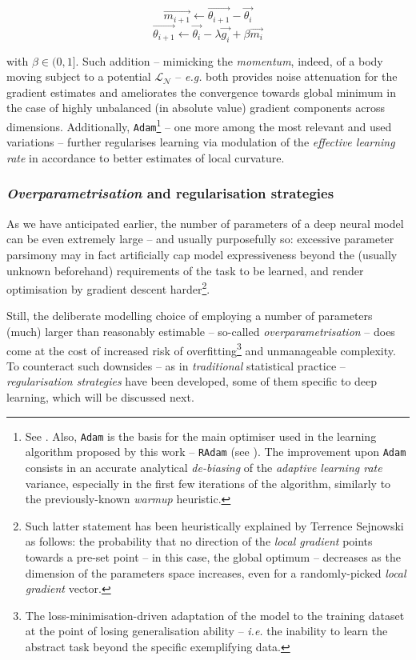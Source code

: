 $$\vec{m_{i+1}} \leftarrow  \vec{\theta_{i+1}} - \vec{\theta_{i}}$$
$$\vec{\theta_{i+1}} \leftarrow  \vec{\theta_{i}} - \lambda\vec{g_i} + \beta\vec{m_i}$$

with $\beta \in (0,1]$. Such addition -- mimicking the \textit{momentum}, indeed, of a body moving subject to a potential $\mathcal{L}_{\mathcal{N}}$ -- \textit{e.g.} both provides noise attenuation for the gradient estimates and ameliorates the convergence towards global minimum in the case of highly unbalanced (in absolute value) gradient components across dimensions. Additionally, \texttt{Adam}\footnote{See \cite{KingmaBa2015Adam}. Also, \texttt{Adam} is the basis for the main optimiser used in the learning algorithm proposed by this work -- \texttt{RAdam} (see \cite{LiuEtAl2020OnTheVariance}). The improvement upon \texttt{Adam} consists in an accurate analytical \textit{de-biasing} of the \textit{adaptive learning rate} variance, especially in the first few iterations of the algorithm, similarly to the previously-known \textit{warmup} heuristic.} -- one more among the most relevant and used variations -- further regularises learning via modulation of the \textit{effective learning rate} in accordance to better estimates of local curvature.

\subsubsection{\textit{Overparametrisation} and regularisation strategies}

As we have anticipated earlier, the number of parameters of a deep neural model can be even extremely large -- and usually purposefully so: excessive parameter parsimony may in fact artificially cap model expressiveness beyond the (usually unknown beforehand) requirements of the task to be learned, and render optimisation by gradient descent harder\footnote{Such latter statement has been heuristically explained by Terrence Sejnowski as follows: the probability that no direction of the \textit{local gradient} points towards a pre-set point -- in this case, the global optimum -- decreases as the dimension of the parameters space increases, even for a randomly-picked \textit{local gradient} vector.}.

Still, the deliberate modelling choice of employing a number of parameters (much) larger than reasonably estimable -- so-called \textit{overparametrisation} -- does come at the cost of increased risk of overfitting\footnote{The loss-minimisation-driven adaptation of the model to the training dataset at the point of losing generalisation ability -- \textit{i.e.} the inability to learn the abstract task beyond the specific exemplifying data.} and unmanageable complexity. To counteract such downsides -- as in \textit{traditional} statistical practice -- \textit{regularisation strategies} have been developed, some of them specific to deep learning, which will be discussed next.

